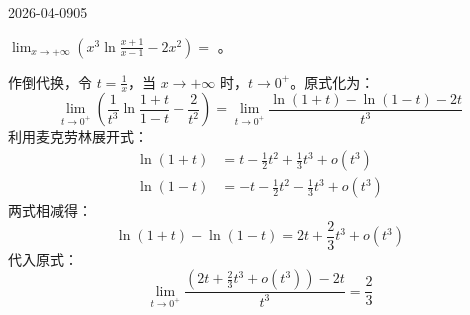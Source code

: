 \begin{mistake}{2026-04-09}{05}\begin{problemcontent}
\( \lim_{x \to +\infty} \left( x^3 \ln \frac{x+1}{x-1} - 2x^2 \right) = \) \underline{\hspace{2em}}。
\end{problemcontent}

\begin{solutioncontent}
作倒代换，令 \(t = \frac{1}{x}\)，当 \(x \to +\infty\) 时，\(t \to 0^+\)。原式化为：
\[
\lim_{t \to 0^+} \left( \frac{1}{t^3} \ln \frac{1+t}{1-t} - \frac{2}{t^2} \right) = \lim_{t \to 0^+} \frac{\ln(1+t) - \ln(1-t) - 2t}{t^3}
\]
利用麦克劳林展开式：
\[
\begin{aligned}
\ln(1+t) &= t - \frac{1}{2}t^2 + \frac{1}{3}t^3 + o(t^3) \\
\ln(1-t) &= -t - \frac{1}{2}t^2 - \frac{1}{3}t^3 + o(t^3)
\end{aligned}
\]
两式相减得：
\[
\ln(1+t) - \ln(1-t) = 2t + \frac{2}{3}t^3 + o(t^3)
\]
代入原式：
\[
\lim_{t \to 0^+} \frac{\left(2t + \frac{2}{3}t^3 + o(t^3)\right) - 2t}{t^3} = \frac{2}{3}
\]
\end{solutioncontent}


\end{mistake}

